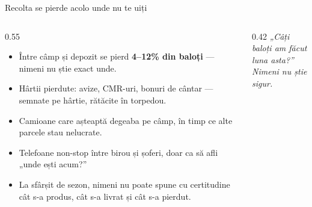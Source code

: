 \documentclass[aspectratio=169,10pt]{beamer}
\begin{document}
\begin{frame}{Recolta se pierde acolo unde nu te uiți}
  \begin{columns}[T]
    \begin{column}{0.55\linewidth}
      \vspace{0.4cm}
      \begin{itemize}
        \item Între câmp și depozit se pierd \textbf{4--12\% din baloți} — nimeni nu știe exact unde.
        \item Hârtii pierdute: avize, CMR-uri, bonuri de cântar — semnate pe hârtie, rătăcite în torpedou.
        \item Camioane care așteaptă degeaba pe câmp, în timp ce alte parcele stau nelucrate.
        \item Telefoane non-stop între birou și șoferi, doar ca să afli „unde ești acum?''
        \item La sfârșit de sezon, nimeni nu poate spune cu certitudine cât s-a produs, cât s-a livrat și cât s-a pierdut.
      \end{itemize}
    \end{column}
    \begin{column}{0.42\linewidth}
      \vspace{0.6cm}
      {\rmfamily\fontsize{22}{26}\selectfont\color{sbInk}\textit{„Câți baloți am făcut\\ luna asta?''}}\\[0.8cm]
      {\rmfamily\fontsize{22}{26}\selectfont\color{sbInk}\textit{Nimeni nu știe\\ sigur.}}
    \end{column}
  \end{columns}
\end{frame}
\end{document}
